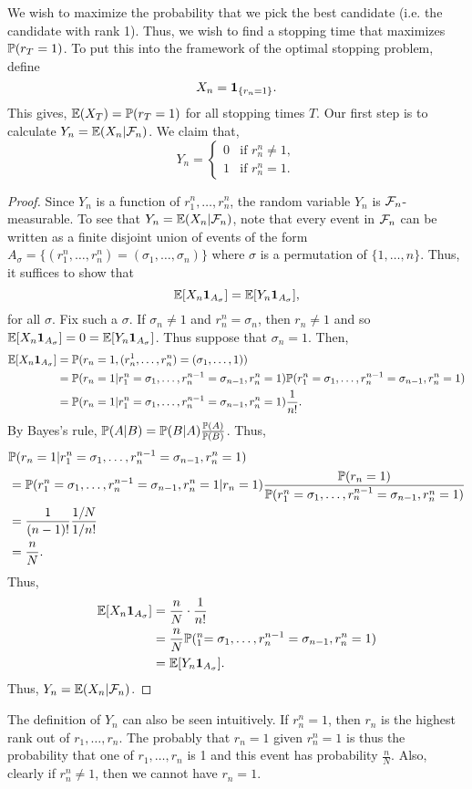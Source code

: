 We wish to maximize the probability that we pick the best candidate (i.e. the candidate with rank 1). Thus, we wish to find a stopping time that maximizes ${\mathbb{P}}(r_T=1)$. To put this into the framework of the optimal stopping problem, define
\[X_n = {{\bf 1}}_{\{r_n=1\}}. \]
This gives, ${\mathbb{E}}(X_T)={\mathbb{P}}(r_T=1)$ for all stopping times $T$. Our first step is to calculate $Y_n = {\mathbb{E}}(X_n|{\mathcal{F}}_n)$. We claim that,
\[Y_n = \begin{cases}
    0 & \text{if } r_n^n \neq 1,\\
    1 & \text{if } r_n^n = 1.
\end{cases} \]
\begin{proof}
Since $Y_n$ is a function of $r_1^n,\ldots, r_n^n$, the random variable $Y_n$ is ${\mathcal{F}}_n$-measurable. To see that $Y_n = {\mathbb{E}}(X_n|{\mathcal{F}}_n)$, note that every event in ${\mathcal{F}}_n$ can be written as a finite disjoint union of events of the form $A_\sigma = \{(r_1^n,\ldots, r_n^n) = (\sigma_1,\ldots,\sigma_n)\}$ where $\sigma$ is a permutation of $\{1,\ldots,n\}$. Thus, it suffices to show that 
\[{\mathbb{E}}[X_n {{\bf 1}}_{A_\sigma}] = {\mathbb{E}}[Y_n {{\bf 1}}_{A_\sigma}], \]
for all $\sigma$. Fix such a $\sigma$. If $\sigma_n \neq 1$ and $r_n^n = \sigma_n$, then $r_n \neq 1$ and so ${\mathbb{E}}[X_n {{\bf 1}}_{A_\sigma}] = 0 = {\mathbb{E}}[Y_n {{\bf 1}}_{A_\sigma}]$. Thus suppose that $\sigma_n=1$. Then,
\begin{align*}
    {\mathbb{E}}[X_n {{\bf 1}}_{A_\sigma}] &= {\mathbb{P}}(r_n = 1, (r_n^1,\ldots, r_n^n)= (\sigma_1,\ldots,1))\\
    &={\mathbb{P}}(r_n=1|r_1^n=\sigma_1,\ldots, r_n^{n-1}=\sigma_{n-1}, r_n^n = 1){\mathbb{P}}(r_1^n=\sigma_1,\ldots, r_n^{n-1}=\sigma_{n-1}, r_n^n = 1)\\
    &={\mathbb{P}}(r_n=1|r_1^n=\sigma_1,\ldots, r_n^{n-1}=\sigma_{n-1}, r_n^n = 1)\frac{1}{n!}.
\end{align*}
By Bayes's rule, ${\mathbb{P}}(A|B) = {\mathbb{P}}(B|A)\frac{{\mathbb{P}}(A)}{{\mathbb{P}}(B)}$. Thus, 
\begin{align*}
    &{\mathbb{P}}(r_n=1|r_1^n=\sigma_1,\ldots, r_n^{n-1}=\sigma_{n-1}, r_n^n = 1)\\
     &= {\mathbb{P}}(r_1^n=\sigma_1,\ldots, r_n^{n-1}=\sigma_{n-1}, r_n^n = 1|r_n=1) \frac{{\mathbb{P}}(r_n=1)}{{\mathbb{P}}(r_1^n=\sigma_1,\ldots, r_n^{n-1}=\sigma_{n-1}, r_n^n = 1)}\\
    &=\frac{1}{(n-1)!} \frac{1/N}{1/n!}\\
    &= \frac{n}{N}.
\end{align*}
Thus,
\begin{align*}
    {\mathbb{E}}[X_n {{\bf 1}}_{A_\sigma}]&=\frac{n}{N}\cdot \frac{1}{n!}\\
    &=\frac{n}{N}{\mathbb{P}}(_1^n=\sigma_1,\ldots, r_n^{n-1}=\sigma_{n-1}, r_n^n = 1)\\
    &={\mathbb{E}}[Y_n{{\bf 1}}_{A_\sigma}].
\end{align*}
Thus, $Y_n = {\mathbb{E}}(X_n|{\mathcal{F}}_n)$.
\end{proof}
The definition of $Y_n$ can also be seen intuitively. If $r_n^n=1$, then $r_n$ is the highest rank out of $r_1,\ldots,r_n$. The probably that $r_n=1$ given $r_n^n=1$ is thus the probability that one of $r_1,\ldots,r_n$ is 1 and this event has probability $\frac{n}{N}$. Also, clearly if $r_n^n \neq 1$, then we cannot have $r_n =1$. 

